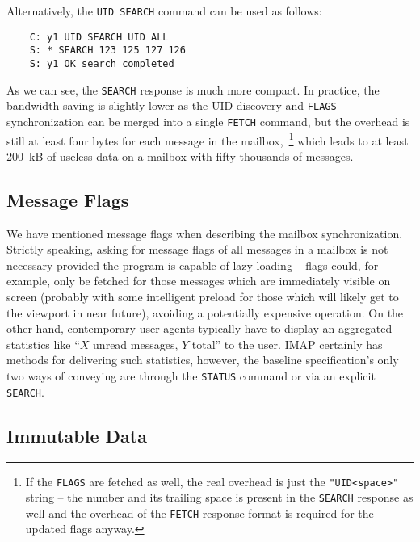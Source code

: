 \documentclass[trojita]{subfiles}
\begin{document}
Alternatively, the {\tt UID SEARCH} command can be used as follows:

\begin{verbatim}
    C: y1 UID SEARCH UID ALL
    S: * SEARCH 123 125 127 126
    S: y1 OK search completed
\end{verbatim}

As we can see, the {\tt SEARCH} response is much more compact.  In practice, the bandwidth saving is slightly lower as
the UID discovery and {\tt FLAGS} synchronization can be merged into a single {\tt FETCH} command, but the overhead is
still at least four bytes for each message in the mailbox,~\footnote{If the {\tt FLAGS} are fetched as well, the real
overhead is just the {\tt "UID<space>"} string -- the number and its trailing space is present in the {\tt SEARCH}
response as well and the overhead of the {\tt FETCH} response format is required for the updated flags anyway.} which
leads to at least 200~kB of useless data on a mailbox with fifty thousands of messages.

\subsection{Message Flags}

We have mentioned message flags when describing the mailbox synchronization.  Strictly speaking, asking for message
flags of all messages in a mailbox is not necessary provided the program is capable of lazy-loading -- flags could, for
example, only be fetched for those messages which are immediately visible on screen (probably with some intelligent
preload for those which will likely get to the viewport in near future), avoiding a potentially expensive operation.  On
the other hand, contemporary user agents typically have to display an aggregated statistics like ``$X$ unread messages,
$Y$ total'' to the user.  IMAP certainly has methods for delivering such statistics, however, the baseline
specification's only two ways of conveying are through the {\tt STATUS} command or via an explicit {\tt SEARCH}.


\subsection{Immutable Data}




\end{document}
